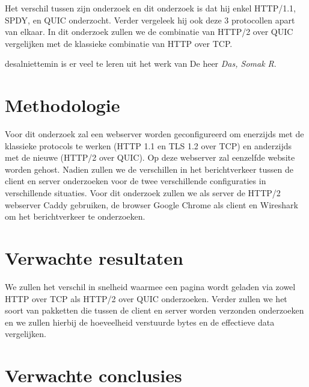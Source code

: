 \documentclass[fleqn,10pt]{voorstel}
\begin{document}
Het verschil tussen zijn onderzoek en dit onderzoek is dat hij enkel
HTTP/1.1, SPDY, en QUIC onderzocht. Verder vergeleek hij ook deze 3  protocollen apart van elkaar. In dit onderzoek zullen we de combinatie van HTTP/2 over QUIC vergelijken met de klassieke combinatie van HTTP over TCP. 

desalniettemin is er veel te leren uit het werk van De heer \emph{Das, Somak R}.



\section{Methodologie}
\label{sec:methodologie}

Voor dit onderzoek zal een webserver worden geconfigureerd om 
enerzijds met de klassieke protocols te werken (HTTP 1.1 en TLS 1.2 over TCP) en anderzijds met de nieuwe (HTTP/2 over QUIC). Op deze webserver zal eenzelfde website worden gehost. Nadien zullen we de verschillen in het berichtverkeer tussen de client en server onderzoeken voor de twee verschillende configuraties in verschillende situaties. Voor dit onderzoek zullen we als server de HTTP/2 webserver Caddy gebruiken, de browser Google Chrome als client en Wireshark om het berichtverkeer te onderzoeken. 

\section{Verwachte resultaten}
\label{sec:verwachte_resultaten}

We zullen het verschil in snelheid waarmee een pagina wordt geladen via zowel HTTP over TCP als HTTP/2 over QUIC onderzoeken. Verder zullen we het soort van pakketten die tussen de client en server worden verzonden onderzoeken en we zullen hierbij de hoeveelheid verstuurde bytes en de effectieve data vergelijken.
\section{Verwachte conclusies}
\label{sec:verwachte_conclusies}
\end{document}
